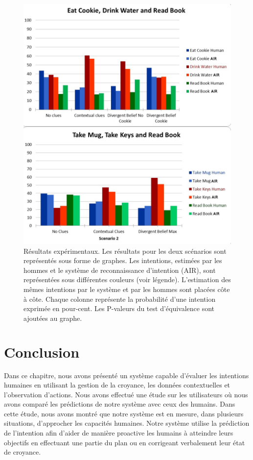 \documentclass[a4paper,11pt,twoside]{StyleThese}
\begin{document}
 \begin{figure}[h!]
	\centering
	\includegraphics[clip,scale=0.6]{img/pvalues1.jpg}
	\caption{Résultats expérimentaux. Les résultats pour les deux scénarios sont représentés sous forme de graphes. Les intentions, estimées par les hommes et le système de reconnaissance d'intention (AIR), sont représentées sous différentes couleurs (voir légende). L'estimation des mêmes intentions par le système et par les hommes sont placées côte à côte. Chaque colonne représente la probabilité d'une intention exprimée en pour-cent. Les P-valeurs du test d'équivalence sont ajoutées au graphe.}
	\label{fig:user_study_results}
  	\vspace{-16pt}
\end{figure}


\section{Conclusion}
Dans ce chapitre, nous avons présenté un système capable d'évaluer les intentions humaines en utilisant la gestion de la croyance, les données contextuelles et l'observation d'actions. Nous avons effectué une étude sur les utilisateurs où nous avons comparé les prédictions de notre système avec ceux des humains. Dans cette étude, nous avons montré que notre système est en mesure, dans plusieurs situations, d'approcher les capacités humaines. Notre système utilise la prédiction de l'intention afin d'aider de manière proactive les humains à atteindre leurs objectifs en effectuant une partie du plan ou en corrigeant verbalement leur état de croyance.
\end{document}
